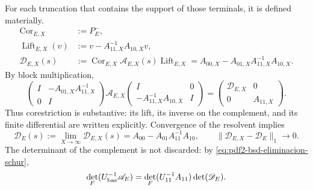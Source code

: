 For each truncation that contains the support of those terminals, it is defined materially.
\begin{equation}\label{eq:pdf2-bsd-cor-lift-truncados}
 \begin{aligned}
  \operatorname{Cor}_{E,X}&:=P_E^-,\\
  \operatorname{Lift}_{E,X}(v)&:=
       v-A_{11,X}^{-1}A_{10,X}v,\\
  \mathscr D_{E,X}(s)&:=
       \operatorname{Cor}_{E,X}\mathscr A_{E,X}(s)
       \operatorname{Lift}_{E,X}
       =A_{00,X}-A_{01,X}A_{11,X}^{-1}A_{10,X}.
 \end{aligned}
\end{equation}
By block multiplication,
\begin{equation}\label{eq:pdf2-bsd-eliminacion-schur}
 \begin{pmatrix}I&-A_{01,X}A_{11,X}^{-1}\\0&I\end{pmatrix}
 \mathscr A_{E,X}
 \begin{pmatrix}I&0\\-A_{11,X}^{-1}A_{10,X}&I\end{pmatrix}
 =\begin{pmatrix}\mathscr D_{E,X}&0\\0&A_{11,X}\end{pmatrix}.
\end{equation}
Thus corestriction is substantive: its lift, its inverse on the complement,
and its finite differential are written explicitly. Convergence of the resolvent
implies
\begin{equation}\label{eq:pdf2-bsd-corestriccion-limite}
 \mathscr D_E(s):=\lim_{X\to\infty}\mathscr D_{E,X}(s)
 =A_{00}-A_{01}A_{11}^{-1}A_{10},
 \qquad
 \|\mathscr D_{E,X}-\mathscr D_E\|_1\to0.
\end{equation}
The determinant of the complement is not discarded: by
\eqref{eq:pdf2-bsd-eliminacion-schur},
\begin{equation}\label{eq:pdf2-bsd-determinante-schur-complemento}
 \det_F(\mathcal U_{\rm bas}^{-1}\mathscr A_E)
 =\det_F(U_{11}^{-1}A_{11})\det(\mathscr D_E).
\end{equation}

